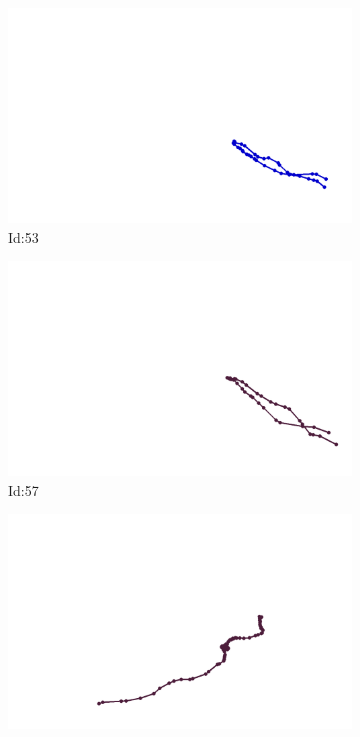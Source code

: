 \documentclass[12pt,twoside]{report}
\begin{document}
\begin{figure}
\centering
\begin{subfigure}[b]{0.20\textwidth}
\centering
\includegraphics[width=\textwidth]{../trajectories/53.png}
\caption{Id:53}
\end{subfigure}
\begin{subfigure}[b]{0.20\textwidth}
\centering
\includegraphics[width=\textwidth]{../trajectories/57.png}
\caption{Id:57}
\end{subfigure}
\begin{subfigure}[b]{0.20\textwidth}
\centering
\includegraphics[width=\textwidth]{../trajectories/92.png}

\end{subfigure}
\end{figure}
\end{document}
